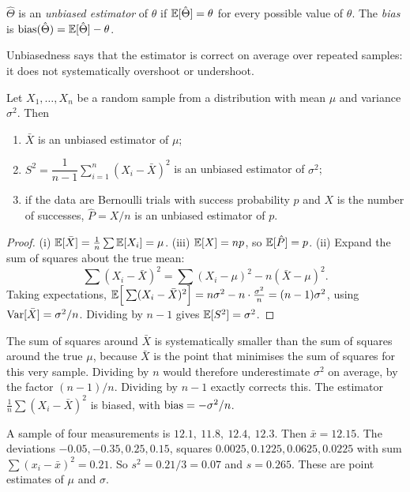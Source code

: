 \begin{definition}
$\hat\Theta$ is an \emph{unbiased estimator} of $\theta$ if $\mathbb{E}[\hat\Theta]=\theta$ for every possible value of $\theta$. The \emph{bias} is $\operatorname{bias}(\hat\Theta)=\mathbb{E}[\hat\Theta]-\theta$.
\end{definition}

Unbiasedness says that the estimator is correct on average over repeated samples: it does not systematically overshoot or undershoot.

\begin{theorem}\label{thm:unbiased}
Let $X_1,\dots,X_n$ be a random sample from a distribution with mean $\mu$ and variance $\sigma^2$. Then
\begin{enumerate}[label=(\roman*)]
  \item $\bar{X}$ is an unbiased estimator of $\mu$;
  \item $S^2=\dfrac{1}{n-1}\sum_{i=1}^n(X_i-\bar{X})^2$ is an unbiased estimator of $\sigma^2$;
  \item if the data are Bernoulli trials with success probability $p$ and $X$ is the number of successes, $\hat{P}=X/n$ is an unbiased estimator of $p$.
\end{enumerate}
\end{theorem}

\begin{proof}
(i) $\mathbb{E}[\bar{X}]=\frac1n\sum\mathbb{E}[X_i]=\mu$. (iii) $\mathbb{E}[X]=np$, so $\mathbb{E}[\hat{P}]=p$. (ii) Expand the sum of squares about the true mean:
\[ \sum(X_i-\bar{X})^2=\sum(X_i-\mu)^2-n(\bar{X}-\mu)^2. \]
Taking expectations, $\mathbb{E}\Big[\sum(X_i-\bar{X})^2\Big]=n\sigma^2-n\cdot\frac{\sigma^2}n=(n-1)\sigma^2$, using $\operatorname{Var}[\bar{X}]=\sigma^2/n$. Dividing by $n-1$ gives $\mathbb{E}[S^2]=\sigma^2$.
\end{proof}

\begin{intuition}
The sum of squares around $\bar{X}$ is systematically smaller than the sum of squares around the true $\mu$, because $\bar{X}$ is the point that minimises the sum of squares for this very sample. Dividing by $n$ would therefore underestimate $\sigma^2$ on average, by the factor $(n-1)/n$. Dividing by $n-1$ exactly corrects this. The estimator $\frac1n\sum(X_i-\bar{X})^2$ is biased, with $\operatorname{bias}=-\sigma^2/n$.
\end{intuition}

\begin{example}
A sample of four measurements is $12.1,\ 11.8,\ 12.4,\ 12.3$. Then $\bar{x}=12.15$. The deviations $-0.05,-0.35,0.25,0.15$, squares $0.0025,0.1225,0.0625,0.0225$ with sum $\sum(x_i-\bar{x})^2=0.21$. So $s^2=0.21/3=0.07$ and $s=0.265$. These are point estimates of $\mu$ and $\sigma$.
\end{example}

